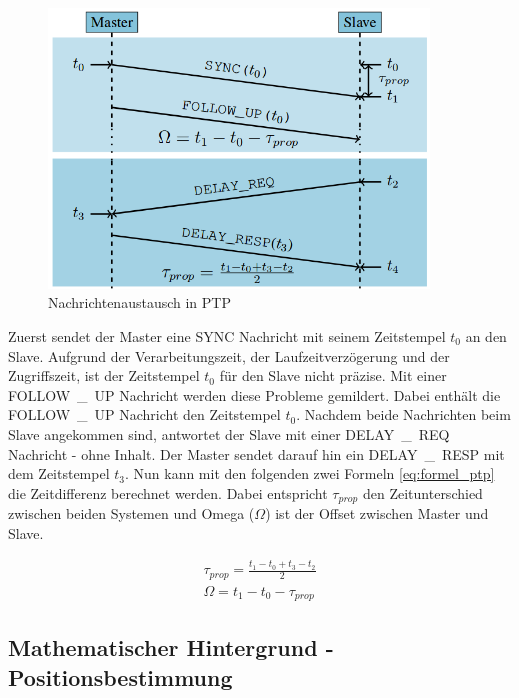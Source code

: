 \begin{figure}[H]
        \centering
        \includegraphics[width=0.9\textwidth]{images/ptp.png}
        \caption{Nachrichtenaustausch in PTP}
        \label{img:ptp}
\end{figure}

Zuerst sendet der Master eine \si{SYNC} Nachricht mit seinem Zeitstempel $t_{0}$ an den Slave. Aufgrund der Verarbeitungszeit, der Laufzeitverzögerung und der Zugriffszeit, ist der Zeitstempel $t_{0}$ für den Slave nicht präzise. Mit einer \si{FOLLOW\_UP} Nachricht werden diese Probleme gemildert. Dabei enthält die \si{FOLLOW\_UP} Nachricht den Zeitstempel $t_{0}$. Nachdem beide Nachrichten beim Slave angekommen sind, antwortet der Slave mit einer \si{DELAY\_REQ} Nachricht - ohne Inhalt. Der Master sendet darauf hin ein \si{DELAY\_RESP} mit dem Zeitstempel $t_{3}$. Nun kann mit den folgenden zwei Formeln \ref{eq:formel_ptp} die Zeitdifferenz berechnet werden. Dabei entspricht $\tau_{prop}$ den Zeitunterschied zwischen beiden Systemen und Omega ($\Omega$) ist der Offset zwischen Master und Slave.

\begin{equation}\label{eq:formel_ptp}
\begin{split}
\tau_{prop} = \frac{t_{1} - t_{0} + t_{3} - t_{2}}{2}
\\
\Omega = t_{1} - t_{0} - \tau_{prop}
\end{split}
\end{equation}


\subsection{Mathematischer Hintergrund - Positionsbestimmung}

